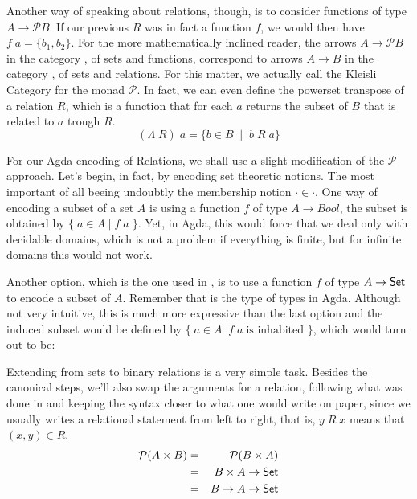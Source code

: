\newcommand{\powerset}{\mathcal{P}}
Another way of speaking about relations, though, is to consider functions of type $A \rightarrow \powerset B$.
If our previous $R$ was in fact a function $f$, we would then have $f\; a = \{b_1, b_2\}$. For the more
mathematically inclined reader, the arrows $A \rightarrow \powerset B$ in the category , of sets and
functions, correspond to arrows $A \rightarrow B$ in the category , of sets and relations. For this matter,
we actually call  the Kleisli Category for the monad $\powerset$. 
In fact, we can even define the powerset transpose of a relation $R$, which is a function that for each $a$
returns the subset of $B$ that is related to $a$ trough $R$.
\[ (\Lambda\; R)\; a = \{ b \in B \;\mid\; b\;R\;a \} \]

For our Agda encoding of Relations, we shall use a slight modification of the $\powerset$ approach.
Let's begin, in fact, by encoding set theoretic notions. The most important of all beeing undoubtly
the membership notion $\cdot \in \cdot$. One way of encoding a subset of a set $A$ is using a function $f$
of type $A \rightarrow Bool$, the subset is obtained by $\{\; a \in A\; |\; f\;a\; \}$. Yet, in Agda, this would
force that we deal only with decidable domains, which is not a problem if everything is finite, but
for infinite domains this would not work.

Another option, which is the one used in \cite{Jansson09}, is to use a function $f$
of type $A \rightarrow \D{Set}$ to encode a subset of $A$. Remember that  is
the type of types in Agda. Although not very intuitive, this is much more expressive than the 
last option and the induced subset would be defined by $\{\; a \in A\; | f\;a\;\text{is inhabited }\}$,
which would turn out to be:


Extending from sets to binary relations is a very simple task. Besides the canonical steps,
we'll also swap the arguments for a relation, following what was done in \cite{Jansson09} and
keeping the syntax closer to what one would write on paper, since we usually writes a relational
statement from left to right, that is, $y\;R\;x$ means that $(x, y) \in R$.
\begin{eqnarray*}
  \powerset (A \times B) & = & \powerset (B \times A)\\
                         & = & B \times A \rightarrow \D{Set}\\
                         & = & B \rightarrow A \rightarrow \D{Set}
\end{eqnarray*}


